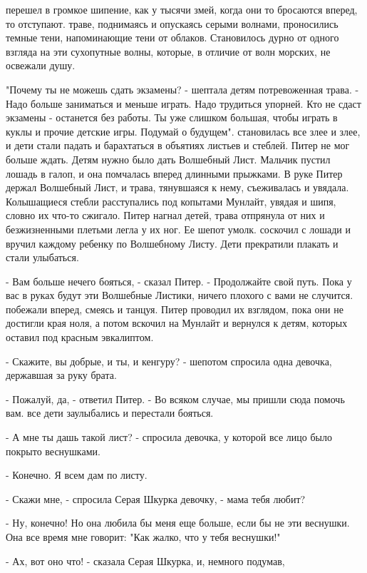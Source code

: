 перешел в громкое шипение, как у тысячи змей, когда они то бросаются 
вперед, то отступают.
 траве, поднимаясь и опускаясь серыми волнами, проносились 
темные тени, напоминающие тени от облаков. Становилось дурно от одного 
взгляда на эти сухопутные волны, которые, в отличие от волн морских, 
не освежали душу.
\par"Почему ты не можешь сдать экзамены? - шептала детям потревоженная 
трава. - Надо больше заниматься и меньше играть. Надо трудиться 
упорней. Кто не сдаст экзамены - останется без работы. Ты уже слишком 
большая, чтобы играть в куклы и прочие детские игры. Подумай о 
будущем".
 становилась все злее и злее, и дети стали падать и 
барахтаться в объятиях листьев и стеблей. Питер не мог больше ждать. 
Детям нужно было дать Волшебный Лист. Мальчик пустил лошадь в галоп, и 
она помчалась вперед длинными прыжками. В руке Питер держал Волшебный 
Лист, и трава, тянувшаяся к нему, съеживалась и увядала. Колышащиеся 
стебли расступались под копытами Мунлайт, увядая и шипя, словно их 
что-то сжигало.
 Питер нагнал детей, трава отпрянула от них и безжизненными 
плетьми легла у их ног. Ее шепот умолк.
 соскочил с лошади и вручил каждому ребенку по Волшебному 
Листу. Дети прекратили плакать и стали улыбаться.
\par- Вам больше нечего бояться, - сказал Питер. - Продолжайте свой 
путь. Пока у вас в руках будут эти Волшебные Листики, ничего плохого с 
вами не случится.
 побежали вперед, смеясь и танцуя. Питер проводил их взглядом, 
пока они не достигли края ноля, а потом вскочил на Мунлайт и вернулся 
к детям, которых оставил под красным эвкалиптом.
\par- Скажите, вы добрые, и ты, и кенгуру? - шепотом спросила одна 
девочка, державшая за руку брата.
\par- Пожалуй, да, - ответил Питер. - Во всяком случае, мы пришли сюда 
помочь вам.
 все дети заулыбались и перестали бояться.
\par- А мне ты дашь такой лист? - спросила девочка, у которой все лицо 
было покрыто веснушками.
\par- Конечно. Я всем дам по листу.
\par- Скажи мне, - спросила Серая Шкурка девочку, - мама тебя любит?
\par- Ну, конечно! Но она любила бы меня еще больше, если бы не эти 
веснушки. Она все время мне говорит: "Как жалко, что у тебя веснушки!"
\par- Ах, вот оно что! - сказала Серая Шкурка, и, немного подумав, 
